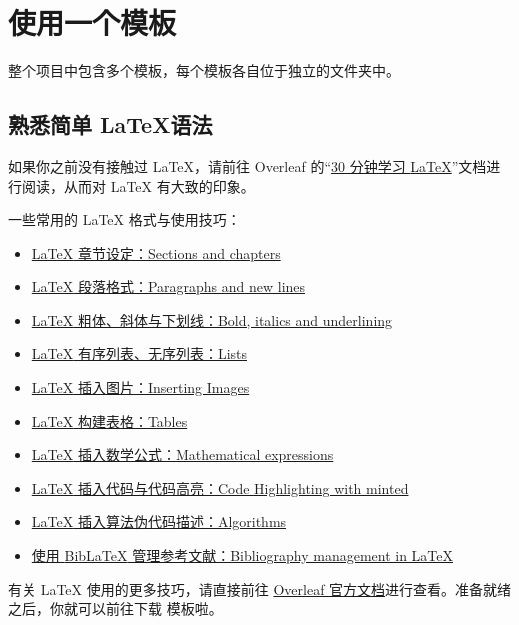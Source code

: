 \section{使用一个模板}
{\BIThesis} 整个项目中包含多个模板，每个模板各自位于独立的文件夹中。

\subsection{熟悉简单 \LaTeX 语法}
如果你之前没有接触过 {\LaTeX}，请前往 Overleaf 的“\href{https://www.overleaf.com/learn/latex/Learn_LaTeX_in_30_minutes}{30 分钟学习 {\LaTeX}}”文档进行阅读，从而对 {\LaTeX} 有大致的印象。

一些常用的 {\LaTeX} 格式与使用技巧：

\begin{itemize}
  \item \href{https://www.overleaf.com/learn/latex/Sections_and_chapters}{{\LaTeX} 章节设定：Sections and chapters}
  \item \href{https://www.overleaf.com/learn/latex/Paragraphs_and_new_lines}{{\LaTeX} 段落格式：Paragraphs and new lines}
  \item \href{https://www.overleaf.com/learn/latex/Bold,_italics_and_underlining}{{\LaTeX} 粗体、斜体与下划线：Bold, italics and underlining}
  \item \href{https://www.overleaf.com/learn/latex/Lists}{{\LaTeX} 有序列表、无序列表：Lists}
  \item \href{https://www.overleaf.com/learn/latex/Inserting_Images}{{\LaTeX} 插入图片：Inserting Images}
  \item \href{https://www.overleaf.com/learn/latex/Tables}{{\LaTeX} 构建表格：Tables}
  \item \href{https://www.overleaf.com/learn/latex/Mathematical_expressions}{{\LaTeX} 插入数学公式：Mathematical expressions}
  \item \href{https://www.overleaf.com/learn/latex/Code_Highlighting_with_minted}{{\LaTeX} 插入代码与代码高亮：Code Highlighting with minted}
  \item \href{https://www.overleaf.com/learn/latex/algorithms}{{\LaTeX} 插入算法伪代码描述：Algorithms}
  \item \href{https://www.overleaf.com/learn/latex/Bibliography_management_in_LaTeX}{使用 {Bib\LaTeX} 管理参考文献：Bibliography management in LaTeX}
\end{itemize}

有关 {\LaTeX} 使用的更多技巧，请直接前往 \href{https://www.overleaf.com/learn/latex/Main_Page}{Overleaf 官方文档}进行查看。准备就绪之后，你就可以前往下载 {\BIThesis} 模板啦。

